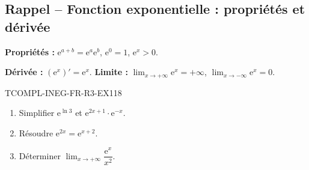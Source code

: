 

\subsection*{Rappel -- Fonction exponentielle : propriétés et dérivée}

\textbf{Propriétés :} $\mathrm{e}^{a+b} = \mathrm{e}^a \mathrm{e}^b$, $\mathrm{e}^0 = 1$, $\mathrm{e}^x > 0$.

\textbf{Dérivée :} $(\mathrm{e}^x)' = \mathrm{e}^x$. \textbf{Limite :} $\lim_{x \to +\infty} \mathrm{e}^x = +\infty$, $\lim_{x \to -\infty} \mathrm{e}^x = 0$.

\begin{exercice}{TCOMPL-INEG-FR-R3-EX1}{1}{8}
\begin{enumerate}
  \item Simplifier $\mathrm{e}^{\ln 3}$ et $\mathrm{e}^{2x + 1} \cdot \mathrm{e}^{-x}$.
  \item Résoudre $\mathrm{e}^{2x} = \mathrm{e}^{x+2}$.
  \item Déterminer $\lim_{x \to +\infty} \dfrac{\mathrm{e}^x}{x^2}$.
\end{enumerate}
\end{exercice}

